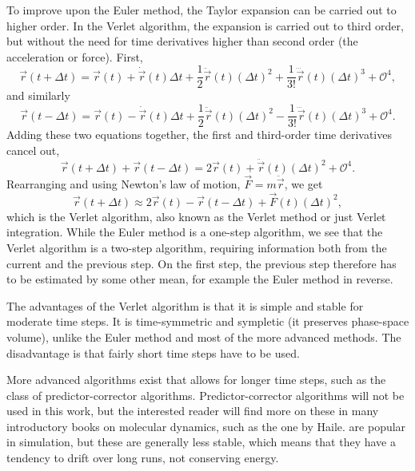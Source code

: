 \documentclass[11pt,bibliography=totoc,index=totoc]{scrbook}   %
\begin{document}
To improve upon the Euler method, the Taylor expansion can be carried out to higher order. In the Verlet algorithm,
the expansion is carried out to third order, but without the need for time derivatives higher than second order
(the acceleration or force). First,
\begin{equation}
  \vec{r}(t+\Delta t) = \vec{r}(t) + \dot{\vec{r}}(t)\Delta t + \frac12 \ddot{\vec{r}}(t)(\Delta t)^2
  + \frac{1}{3!} \dddot{\vec{r}}(t)(\Delta t)^3 + \mathcal{O}^4,
\end{equation}
and similarly
\begin{equation}
  \vec{r}(t-\Delta t) = \vec{r}(t) - \dot{\vec{r}}(t)\Delta t + \frac12 \ddot{\vec{r}}(t)(\Delta t)^2
   - \frac{1}{3!} \dddot{\vec{r}}(t)(\Delta t)^3 + \mathcal{O}^4.
\end{equation}
Adding these two equations together, the first and third-order time derivatives cancel out,
\begin{equation}
 \vec{r}(t+\Delta t) + \vec{r}(t-\Delta t) = 2\vec{r}(t) + \ddot{\vec{r}}(t)(\Delta t)^2 + \mathcal{O}^4.
\end{equation}
Rearranging and using Newton's law of motion, $\vec{F}=m\ddot{\vec{r}}$, we get
\begin{equation}
  \vec{r}(t+\Delta t) \approx 2\vec{r}(t) - \vec{r}(t-\Delta t) + \vec{F}(t)(\Delta t)^2,
\end{equation}
which is the Verlet algorithm, also known as the Verlet method or just Verlet integration. 
While the Euler method is a one-step algorithm, we see that the Verlet algorithm is a two-step algorithm, requiring information both from the current and the previous step.
On the first step, the previous step therefore has to be estimated by some other mean, for example the Euler method in reverse.

The advantages of the Verlet algorithm is that it is simple and stable for moderate time steps.
It is time-symmetric and sympletic (it preserves phase-space volume), unlike the Euler method and most of the more advanced methods.
The disadvantage is that fairly short time steps have to be used. 

More advanced algorithms exist that allows for longer time steps, such as the class of predictor-corrector algorithms.
Predictor-corrector algorithms will not be used in this work, but the interested reader will find more on these in many introductory books on molecular dynamics, such as the one by Haile\cite[158]{Haile:1992}.
are popular in simulation, but these are generally less stable, which means that they have a tendency to drift over long runs, not conserving energy.
\end{document}
